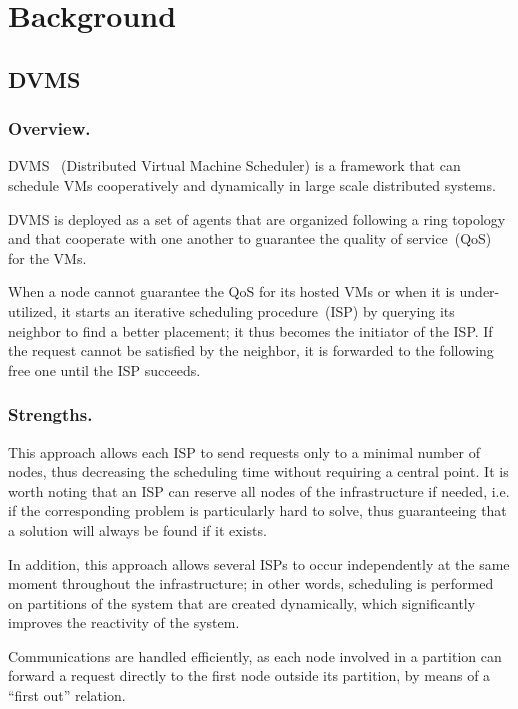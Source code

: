 \section{Background}


\subsection{DVMS}

\subsubsection{Overview.}
DVMS~\cite{quesnel:ispa13,quesnel:cpe12}
(Distributed Virtual Machine Scheduler) is a framework that can schedule VMs
cooperatively and dynamically in large scale distributed
systems.

DVMS is deployed as a set of agents that are organized following a ring
topology and that cooperate with one another to guarantee the quality of
service~(QoS) for the VMs.

When a node cannot guarantee the QoS for its hosted VMs or when it is
under-utilized, it starts an iterative scheduling procedure~(ISP) by querying
its neighbor to find a better placement; it thus becomes the initiator of the ISP.
If the request cannot be satisfied by the neighbor, it is forwarded to the
following free one until the ISP succeeds.

\subsubsection{Strengths.}
This approach allows each ISP to send requests only to a minimal
number of nodes, thus decreasing the scheduling time without requiring a
central point.
%
It is worth noting that an ISP can reserve all nodes of the
infrastructure if needed, i.e. if the corresponding problem is particularly hard to solve, thus
guaranteeing that a solution will always be found if it exists.

In addition, this approach allows several ISPs to occur independently at the
same moment throughout the infrastructure; in other words, scheduling is
performed on partitions of the system that are created dynamically, which
significantly improves the reactivity of the system.

Communications are handled efficiently, as each node involved in a partition
can forward a request directly to the first node outside its partition, by
means of a ``first out'' relation.

